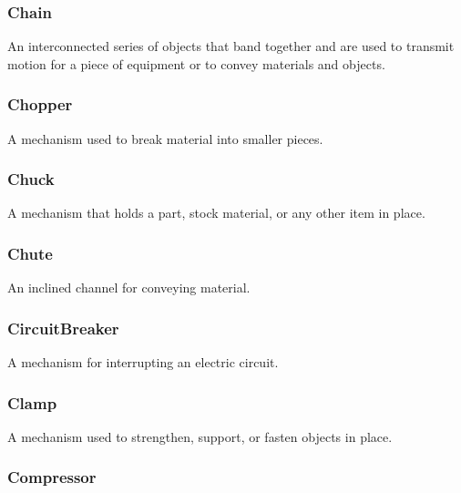 \subsubsection{Chain}
\label{sec:Chain}



An interconnected series of objects that band together and are used to transmit motion for a piece of equipment or to convey materials and objects.


\subsubsection{Chopper}
\label{sec:Chopper}



A mechanism used to break material into smaller pieces.


\subsubsection{Chuck}




A mechanism that holds a part, stock material, or any other item in place.


\subsubsection{Chute}
\label{sec:Chute}



An inclined channel for conveying material.


\subsubsection{CircuitBreaker}
\label{sec:CircuitBreaker}



A mechanism for interrupting an electric circuit.


\subsubsection{Clamp}
\label{sec:Clamp}



A mechanism used to strengthen, support, or fasten objects in place.


\subsubsection{Compressor}
\label{sec:Compressor}



